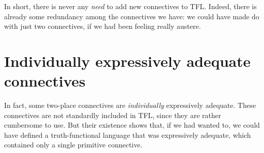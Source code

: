 In short, there is never any \emph{need} to add new connectives to TFL. Indeed, there is already some redundancy among the connectives we have: we could have made do with just two connectives, if we had been feeling really austere.

\section{Individually expressively adequate connectives}
In fact, some two-place connectives are \emph{individually} expressively adequate. These connectives are not standardly included in TFL, since they are rather cumbersome to use. But their existence shows that, if we had wanted to, we could have defined a truth-functional language that was expressively adequate, which contained only a single primitive connective.

